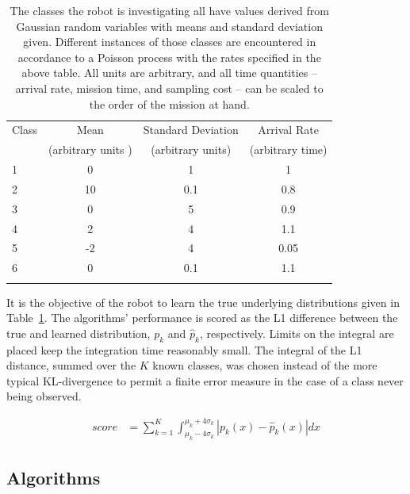 \begin{table}[htpd!]
	\centering
	\begin{tabular}{l|ccc}
		Class & Mean & Standard Deviation & Arrival Rate\\
							 & (arbitrary units )  & (arbitrary units) & (arbitrary time)\\
 		\hline
		1 & 0 & 1 & 1\\
		2 & 10 & 0.1 & 0.8 \\
		3 & 0 & 5 & 0.9\\
		4 & 2 & 4 & 1.1\\
		5 & -2 & 4 & 0.05\\
		6 & 0 & 0.1 & 1.1\\
		\hline 
		\\
	\end{tabular}
	\caption{The classes the robot is investigating all have values derived from Gaussian random variables with means and standard deviation given.  Different instances of those classes are encountered in accordance to a Poisson process with the rates specified in the above table.  All units are arbitrary, and all time quantities -- arrival rate, mission time, and sampling cost -- can be scaled to the order of the mission at hand.}
	\label{tbl:classes}
\end{table}

It is the objective of the robot to learn the true underlying distributions given in Table~\ref{tbl:classes}.  The algorithms' performance is scored as the L1 difference between the true and learned distribution, $p_k$ and $\hat{p}_k$, respectively.  Limits on the integral are placed keep the integration time reasonably small.  The integral of the L1 distance, summed over the $K$ known classes, was chosen instead of the more typical KL-divergence to permit a finite error measure in the case of a class never being observed.

\begin{align}
\label{eq:score}
	score &= \sum_{k=1}^{K} \int_{\mu_{k}-4\sigma_{k}}^{\mu_{k}+4\sigma_{k}} \left| p_{k}(x) - \hat{p}_{k}(x)\right| dx
\end{align}

\subsection{Algorithms}

